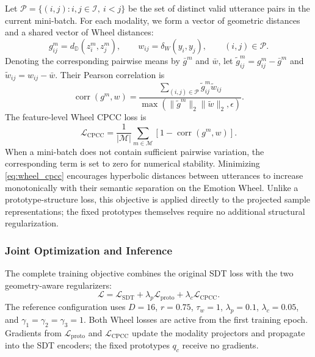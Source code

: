 \documentclass[letterpaper,journal]{IEEEtran}
\begin{document}
Let
\(\mathcal{P}=\{(i,j):i,j\in\mathcal{I},\ i<j\}\)
be the set of distinct valid utterance pairs in the current mini-batch. For
each modality, we form a vector of geometric distances and a shared vector of
Wheel distances:
\begin{equation}
    g_{ij}^{m}=d_{\mathbb{D}}(z_i^{m},z_j^{m}),
    \qquad
    w_{ij}=\delta_W(y_i,y_j),
    \qquad(i,j)\in\mathcal{P}.
    \label{eq:cpcc_pair_distances}
\end{equation}
Denoting the corresponding pairwise means by
\(\bar{g}^{m}\) and \(\bar{w}\), let
\(\widetilde{g}_{ij}^{m}=g_{ij}^{m}-\bar{g}^{m}\) and
\(\widetilde{w}_{ij}=w_{ij}-\bar{w}\). Their Pearson correlation is
\begin{equation}
    \operatorname{corr}(g^{m},w)
    =
    \frac{\sum_{(i,j)\in\mathcal{P}}
    \widetilde{g}_{ij}^{m}\widetilde{w}_{ij}}
    {\max\!\left(
    \lVert\widetilde{g}^{m}\rVert_2
    \lVert\widetilde{w}\rVert_2,\epsilon\right)}.
    \label{eq:cpcc_correlation}
\end{equation}
The feature-level Wheel CPCC loss is
\begin{equation}
    \mathcal{L}_{\mathrm{CPCC}}
    =\frac{1}{|\mathcal{M}|}
    \sum_{m\in\mathcal{M}}
    \left[1-\operatorname{corr}(g^{m},w)\right].
    \label{eq:wheel_cpcc}
\end{equation}
When a mini-batch does not contain sufficient pairwise variation, the
corresponding term is set to zero for numerical stability. Minimizing
\eqref{eq:wheel_cpcc} encourages hyperbolic distances between utterances to
increase monotonically with their semantic separation on the Emotion Wheel.
Unlike a prototype-structure loss, this objective is applied directly to the
projected sample representations; the fixed prototypes themselves require no
additional structural regularization.

\subsubsection{Joint Optimization and Inference}

The complete training objective combines the original SDT loss with the two
geometry-aware regularizers:
\begin{equation}
    \boxed{
    \mathcal{L}
    =\mathcal{L}_{\mathrm{SDT}}
    +\lambda_p\mathcal{L}_{\mathrm{proto}}
    +\lambda_c\mathcal{L}_{\mathrm{CPCC}}}
    .
    \label{eq:complete_objective}
\end{equation}
The reference configuration uses
\(D=16\), \(r=0.75\), \(\tau_w=1\),
\(\lambda_p=0.1\), \(\lambda_c=0.05\), and
\(\gamma_1=\gamma_2=\gamma_3=1\). Both Wheel losses are active from the
first training epoch. Gradients from
\(\mathcal{L}_{\mathrm{proto}}\) and
\(\mathcal{L}_{\mathrm{CPCC}}\) update the modality projectors and propagate
into the SDT encoders; the fixed prototypes \(q_c\) receive no gradients.
\end{document}

